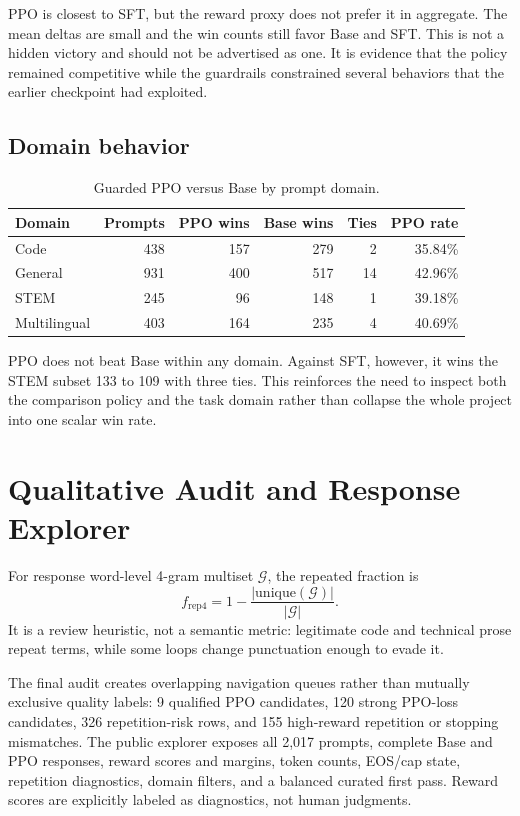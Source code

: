 \documentclass[11pt]{article}
\begin{document}
PPO is closest to SFT, but the reward proxy does not prefer it in aggregate.
The mean deltas are small and the win counts still favor Base and SFT. This is
not a hidden victory and should not be advertised as one. It is evidence that
the policy remained competitive while the guardrails constrained several
behaviors that the earlier checkpoint had exploited.

\subsection{Domain behavior}

\begin{table}[H]
\centering
\caption{Guarded PPO versus Base by prompt domain.}
\label{tab:domains}
\begin{tabular}{@{}lrrrrr@{}}
\toprule
\textbf{Domain} & \textbf{Prompts} & \textbf{PPO wins} &
\textbf{Base wins} & \textbf{Ties} & \textbf{PPO rate}\\
\midrule
Code & 438 & 157 & 279 & 2 & 35.84\%\\
General & 931 & 400 & 517 & 14 & 42.96\%\\
STEM & 245 & 96 & 148 & 1 & 39.18\%\\
Multilingual & 403 & 164 & 235 & 4 & 40.69\%\\
\bottomrule
\end{tabular}
\end{table}

PPO does not beat Base within any domain. Against SFT, however, it wins the
STEM subset 133 to 109 with three ties. This reinforces the need to inspect
both the comparison policy and the task domain rather than collapse the whole
project into one scalar win rate.

\section{Qualitative Audit and Response Explorer}
\label{sec:audit}

For response word-level 4-gram multiset $\mathcal{G}$, the repeated fraction is
\begin{equation}
f_{\mathrm{rep4}}=1-\frac{|\mathrm{unique}(\mathcal{G})|}{|\mathcal{G}|}.
\end{equation}
It is a review heuristic, not a semantic metric: legitimate code and technical
prose repeat terms, while some loops change punctuation enough to evade it.

The final audit creates overlapping navigation queues rather than mutually
exclusive quality labels: 9 qualified PPO candidates, 120 strong PPO-loss
candidates, 326 repetition-risk rows, and 155 high-reward repetition or
stopping mismatches. The public explorer exposes all 2,017 prompts, complete
Base and PPO responses, reward scores and margins, token counts, EOS/cap state,
repetition diagnostics, domain filters, and a balanced curated first pass.
Reward scores are explicitly labeled as diagnostics, not human judgments.
\end{document}
